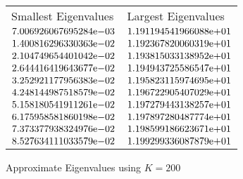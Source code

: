 \begin{enumerate}
\begin{figure} 
 \centering    
\begin{tabular}{ ||p{6cm}||p{6cm}|}
\hline
 Smallest Eigenvalues & Largest Eigenvalues \\ \hhline{|=|=|}   
\hline
${7.006926067695284}\mathrm{e}{-03}$ & ${1.191194541966088}\mathrm{e}{+01}$ \\  
${1.400816296330363}\mathrm{e}{-02}$ & ${1.192367820060319}\mathrm{e}{+01}$ \\  
${2.104749654401042}\mathrm{e}{-02}$ & ${1.193815033138952}\mathrm{e}{+01}$ \\  
${2.644416419643677}\mathrm{e}{-02}$ & ${1.194943725586547}\mathrm{e}{+01}$ \\  
${3.252921177956383}\mathrm{e}{-02}$ & ${1.195823115974695}\mathrm{e}{+01}$ \\  
${4.248144987518579}\mathrm{e}{-02}$ & ${1.196722905407029}\mathrm{e}{+01}$ \\  
${5.158180541911261}\mathrm{e}{-02}$ & ${1.197279443138257}\mathrm{e}{+01}$ \\  
${6.175958581860198}\mathrm{e}{-02}$ & ${1.197897280487774}\mathrm{e}{+01}$ \\  
${7.373377938324976}\mathrm{e}{-02}$ & ${1.198599186623671}\mathrm{e}{+01}$ \\  
${8.527634111033579}\mathrm{e}{-02}$ & ${1.199299336087879}\mathrm{e}{+01}$ \\  
\hline  
\end{tabular} 
\caption{Approximate Eigenvalues using $K = 200$}
   \label{tab:eig200}
\end{figure} 


\end{enumerate}
